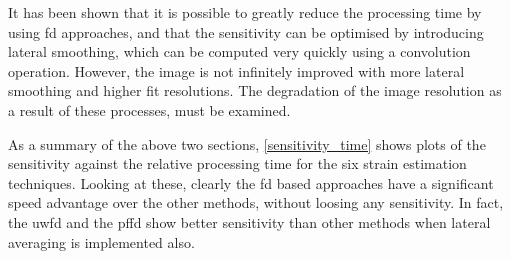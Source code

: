 It has been shown that it is possible to greatly reduce the processing time by using \ac{fd} approaches, and that the sensitivity can be optimised by introducing lateral smoothing, which can be computed very quickly using a convolution operation. However, the image is not infinitely improved with more lateral smoothing and higher fit resolutions. The degradation of the image resolution as a result of these processes, must be examined.

As a summary of the above two sections, \autoref{sensitivity_time} shows plots of the sensitivity against the relative processing time for the six strain estimation techniques. Looking at these, clearly the \ac{fd} based approaches have a significant speed advantage over the other methods, without loosing any sensitivity. In fact, the \ac{uwfd} and the \ac{pffd} show better sensitivity than other methods when lateral averaging is implemented also.

